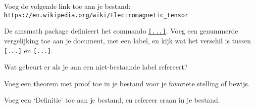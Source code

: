 \documentclass[a4paper]{article}
\begin{document}

    \begin{exercise}[URL's]
        Voeg de volgende link toe aan je bestand:\\
        \nolinkurl{https://en.wikipedia.org/wiki/Electromagnetic_tensor}
    \end{exercise}

    \begin{exercise}
        De amsmath package definieert het commando \texttt{\eqref{...}}.
        Voeg een genummerde vergelijking toe aan je document, met een label, en
        kijk wat het verschil is tussen \texttt{\ref{...}}
        en \texttt{\eqref{...}}.
    \end{exercise}

    \begin{exercise}[Labels]
        Wat gebeurt er als je aan een niet-bestaande label refereert?
    \end{exercise}

    \begin{exercise}
        Voeg een theorem met proof toe in je bestand voor je favoriete stelling of bewijs.
    \end{exercise}

    \begin{exercise}[Definitie]
        Voeg een `Definitie' toe aan je bestand, en refereer eraan in je bestand.
    \end{exercise}
\end{document}
